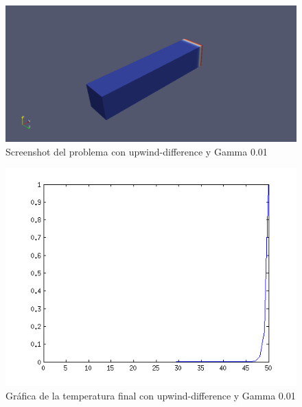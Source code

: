 \documentclass[11pt]{article}
\begin{document}
\begin{figure}[tbh]
	\centering
		\includegraphics[width=1.0\textwidth]{imagen26.png}
	\caption{Screenshot del problema con upwind-difference y Gamma 0.01}
	\label{fig:Fig1}
\end{figure}

\begin{figure}[tbh]
	\centering
		\includegraphics[width=1.0\textwidth]{imagen27.png}
	\caption{Gr\'afica de la temperatura final con upwind-difference y Gamma 0.01}
	\label{fig:Fig1}
\end{figure}
\end{document}
